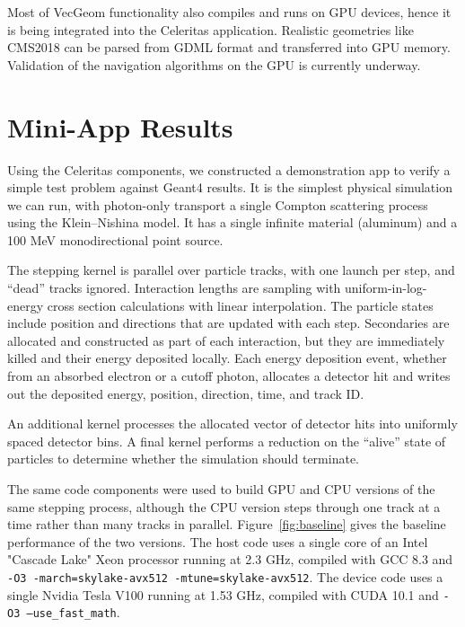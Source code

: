 \documentclass{webofc}
\begin{document}
Most of VecGeom functionality also compiles and runs on GPU devices, hence it is
being integrated into the Celeritas application. Realistic geometries like
CMS2018 can be parsed from GDML format and transferred into GPU memory.
Validation of the navigation algorithms on the GPU is currently underway.


\section{Mini-App Results}
\label{sec:miniapp}

Using the Celeritas components, we constructed a demonstration app to verify a
simple test problem against Geant4 results. It is the simplest physical
simulation we can run, with photon-only transport a single
Compton scattering process using the Klein--Nishina model.  It has a single
infinite material (aluminum) and a 100 MeV monodirectional point source.

The stepping kernel is parallel over particle tracks, with one launch per step,
and ``dead'' tracks ignored. Interaction lengths are sampling with
uniform-in-log-energy cross section calculations with linear interpolation. The
particle states include position and directions that are updated with each step.
Secondaries are allocated and constructed as part of each interaction, but they
are immediately killed and their energy deposited locally. Each energy
deposition event, whether from an absorbed electron or a cutoff photon,
allocates a detector hit and writes out the deposited energy, position,
direction, time, and track ID.

An additional kernel processes the allocated vector of detector hits into
uniformly spaced detector bins. A final kernel performs a reduction on the
``alive'' state of particles to determine whether the simulation should
terminate.

The same code components were used to build GPU and CPU versions of the same
stepping process, although the CPU version steps through one track at a time
rather than many tracks in parallel.  Figure~\ref{fig:baseline} gives the
baseline performance of the two versions. The host code uses a single core of an
Intel "Cascade Lake" Xeon processor running at 2.3 GHz, compiled with GCC 8.3
and \texttt{-O3 -march=skylake-avx512 -mtune=skylake-avx512}. The device code
uses a single Nvidia Tesla V100 running at 1.53 GHz, compiled with CUDA 10.1 and
\texttt{-O3 --use\_fast\_math}.
\end{document}
